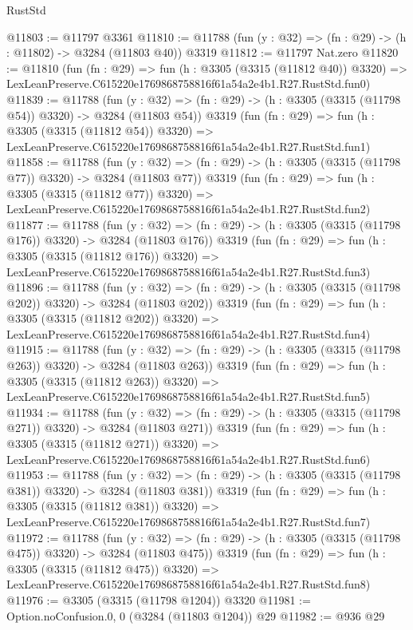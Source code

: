 \begin{lexlean}{RustStd}
\begin{coremodule}
@11803 := @11797 @3361
@11810 := @11788 (fun (y : @32) => (fn : @29) -> (h : @11802) -> @3284 (@11803 @40)) @3319
@11812 := @11797 Nat.zero
@11820 := @11810
    (fun (fn : @29) =>
    fun (h : @3305 (@3315 (@11812 @40)) @3320) =>
    LexLeanPreserve.C615220e1769868758816f61a54a2e4b1.R27.RustStd.fun0)
@11839 := @11788
    (fun (y : @32) => (fn : @29) -> (h : @3305 (@3315 (@11798 @54)) @3320) -> @3284 (@11803 @54))
    @3319
    (fun (fn : @29) =>
    fun (h : @3305 (@3315 (@11812 @54)) @3320) =>
    LexLeanPreserve.C615220e1769868758816f61a54a2e4b1.R27.RustStd.fun1)
@11858 := @11788
    (fun (y : @32) => (fn : @29) -> (h : @3305 (@3315 (@11798 @77)) @3320) -> @3284 (@11803 @77))
    @3319
    (fun (fn : @29) =>
    fun (h : @3305 (@3315 (@11812 @77)) @3320) =>
    LexLeanPreserve.C615220e1769868758816f61a54a2e4b1.R27.RustStd.fun2)
@11877 := @11788
    (fun (y : @32) => (fn : @29) -> (h : @3305 (@3315 (@11798 @176)) @3320) -> @3284 (@11803 @176))
    @3319
    (fun (fn : @29) =>
    fun (h : @3305 (@3315 (@11812 @176)) @3320) =>
    LexLeanPreserve.C615220e1769868758816f61a54a2e4b1.R27.RustStd.fun3)
@11896 := @11788
    (fun (y : @32) => (fn : @29) -> (h : @3305 (@3315 (@11798 @202)) @3320) -> @3284 (@11803 @202))
    @3319
    (fun (fn : @29) =>
    fun (h : @3305 (@3315 (@11812 @202)) @3320) =>
    LexLeanPreserve.C615220e1769868758816f61a54a2e4b1.R27.RustStd.fun4)
@11915 := @11788
    (fun (y : @32) => (fn : @29) -> (h : @3305 (@3315 (@11798 @263)) @3320) -> @3284 (@11803 @263))
    @3319
    (fun (fn : @29) =>
    fun (h : @3305 (@3315 (@11812 @263)) @3320) =>
    LexLeanPreserve.C615220e1769868758816f61a54a2e4b1.R27.RustStd.fun5)
@11934 := @11788
    (fun (y : @32) => (fn : @29) -> (h : @3305 (@3315 (@11798 @271)) @3320) -> @3284 (@11803 @271))
    @3319
    (fun (fn : @29) =>
    fun (h : @3305 (@3315 (@11812 @271)) @3320) =>
    LexLeanPreserve.C615220e1769868758816f61a54a2e4b1.R27.RustStd.fun6)
@11953 := @11788
    (fun (y : @32) => (fn : @29) -> (h : @3305 (@3315 (@11798 @381)) @3320) -> @3284 (@11803 @381))
    @3319
    (fun (fn : @29) =>
    fun (h : @3305 (@3315 (@11812 @381)) @3320) =>
    LexLeanPreserve.C615220e1769868758816f61a54a2e4b1.R27.RustStd.fun7)
@11972 := @11788
    (fun (y : @32) => (fn : @29) -> (h : @3305 (@3315 (@11798 @475)) @3320) -> @3284 (@11803 @475))
    @3319
    (fun (fn : @29) =>
    fun (h : @3305 (@3315 (@11812 @475)) @3320) =>
    LexLeanPreserve.C615220e1769868758816f61a54a2e4b1.R27.RustStd.fun8)
@11976 := @3305 (@3315 (@11798 @1204)) @3320
@11981 := Option.noConfusion.{0, 0} (@3284 (@11803 @1204)) @29
@11982 := @936 @29

\end{coremodule}
\end{lexlean}
